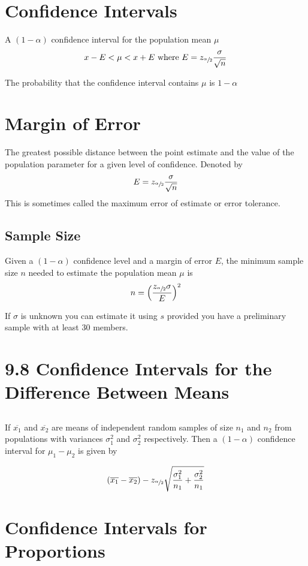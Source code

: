 \documentclass{book}
\begin{document}
\section{Confidence Intervals}
A $(1-\alpha)$ confidence interval for the population mean $\mu$
$$x-E < \mu < x+E \text{ where } E = z_{\sfrac{\alpha}{2}}\frac{\sigma}{\sqrt{n}}$$

The probability that the confidence interval contains $\mu$ is $1-\alpha$

\section{Margin of Error}
The greatest possible distance between the point estimate and the value of the population parameter for a given level of confidence.
Denoted by $$E = z_{\sfrac{\alpha}{2}}\frac{\sigma}{\sqrt{n}}$$
This is sometimes called the maximum error of estimate or error tolerance.

\subsection{Sample Size}
Given a $(1-\alpha)$ confidence level and a margin of error $E$, the minimum sample size $n$ needed to estimate the population mean $\mu$ is 
$$n=\left ( \frac{z_{\sfrac{\alpha}{2}}\sigma}{E}\right )^2$$

If $\sigma$ is unknown you can estimate it using $s$ provided you have a preliminary sample with at least 30 members.

\section{9.8 Confidence Intervals for the Difference Between Means}

\subsection{}
If $\overline{x_1}$ and $\overline{x_2}$ are means of independent random samples of size $n_1$ and $n_2$ from populations with variances $\sigma_1^2$ and $\sigma_2^2$ respectively. Then a $(1-\alpha)$ confidence interval for $\mu_1 - \mu_2$ is given by

$$(\overline{x_1} - \overline{x_2}) - z_{\sfrac{\alpha}{2}} \sqrt{\frac{\sigma_1^2}{n_1} + \frac{\sigma_2^2}{n_1}}$$


\section{Confidence Intervals for Proportions}
\end{document}
